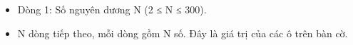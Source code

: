 \begin{itemize}
	\item Dòng 1: Số nguyên dương N (2 ≤ N ≤ 300).
	\item N dòng tiếp theo, mỗi dòng gồm N số. Đây là giá trị của các ô trên bàn cờ.
\end{itemize}